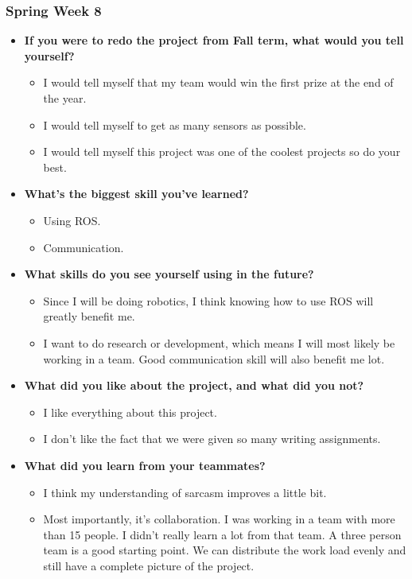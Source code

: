 \documentclass[compsoc,draftclsnofoot,onecolumn,10pt]{IEEEtran}
\begin{document}
\subsubsection{Spring Week 8}
\begin{itemize}
    \item {\textbf{If you were to redo the project from Fall term, what would you tell yourself?}}
    \begin{itemize}
      \item I would tell myself that my team would win the first prize at the end of the year.
      \item I would tell myself to get as many sensors as possible.
      \item I would tell myself this project was one of the coolest projects so do your best.
    \end{itemize}

    \item {\textbf{What's the biggest skill you've learned?}}
    \begin{itemize}
      \item Using ROS.
      \item Communication.
    \end{itemize}

    \item{\textbf{What skills do you see yourself using in the future?}}
    \begin{itemize}
      \item Since I will be doing robotics, I think knowing how to use ROS will greatly benefit me.
      \item I want to do research or development, which means I will most likely be working in a
      team. Good communication skill will also benefit me lot.
    \end{itemize}

    \item{\textbf{What did you like about the project, and what did you not?}}
    \begin{itemize}
      \item I like everything about this project.
      \item I don't like the fact that we were given so many writing assignments.
    \end{itemize}

    \item{\textbf{What did you learn from your teammates?}}
    \begin{itemize}
      \item I think my understanding of sarcasm improves a little bit.
      \item Most importantly, it's collaboration. I was working in a team with more
      than 15 people. I didn't really learn a lot from that team. A three person team
      is a good starting point. We can distribute the work load evenly and still have
      a complete picture of the project.
    \end{itemize}


\end{itemize}
\end{document}

